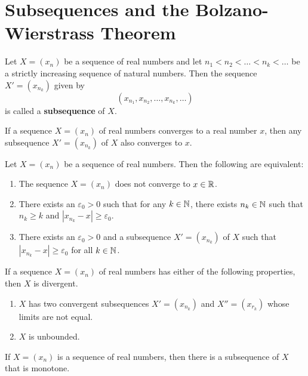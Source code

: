 \section{Subsequences and the Bolzano-Wierstrass Theorem}

\begin{definition}
	Let $X=(x_n)$ be a sequence of real numbers and let $n_1 < n_2 < \dots < n_k < \dots$ be a strictly increasing sequence of natural numbers. Then the sequence $X' = (x_{n_k})$ given by
	\[(x_{n_1}, x_{n_2}, \dots, x_{n_k}, \dots)\]
	is called a \textbf{subsequence} of $X$.
\end{definition}

\begin{theorem}
	If a sequence $X=(x_n)$ of real numbers converges to a real number $x$, then any subsequence $X' = (x_{n_k})$ of $X$ also converges to $x$.
\end{theorem}

\begin{theorem}
	Let $X=(x_n)$ be a sequence of real numbers. Then the following are equivalent:
	\begin{enumerate}
		\item The sequence $X=(x_n)$ does not converge to $x \in \mathbb{R}$.

		\item There exists an $\varepsilon_0 > 0$ such that for any $k \in \mathbb{N}$, there exists $n_k \in \mathbb{N}$ such that $n_k \geq k$ and $|x_{n_k}-x| \geq \varepsilon_0$.

		\item There exists an $\varepsilon_0>0$ and a subsequence $X'=(x_{n_k})$ of $X$ such that $|x_{n_k}-x| \geq \varepsilon_0$ for all $k \in \mathbb{N}$.
	\end{enumerate}
\end{theorem}

\begin{theorem}
	If a sequence $X=(x_n)$ of real numbers has either of the following properties, then $X$ is divergent.
	\begin{enumerate}
		\item $X$ has two convergent subsequences $X'=(x_{n_k})$ and $X''=(x_{r_k})$ whose limits are not equal.

		\item $X$ is unbounded.
	\end{enumerate}
\end{theorem}

\begin{theorem}
	If $X=(x_n)$ is a sequence of real numbers, then there is a subsequence of $X$ that is monotone.
\end{theorem}

